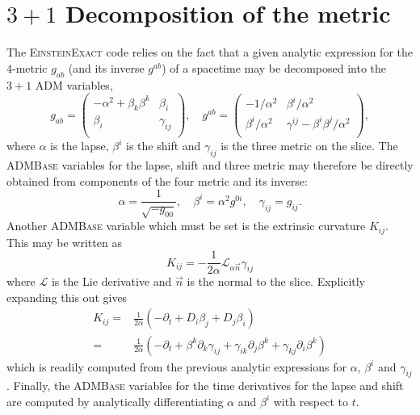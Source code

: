 \documentclass{article}
\begin{document}
\section{$3+1$ Decomposition of the metric}
The \textsc{EinsteinExact} code relies on the fact that a given analytic
expression for the $4$-metric $g_{ab}$ (and its inverse $g^{ab}$) of a spacetime
may be decomposed into the $3+1$ ADM variables,
\begin{equation}
g_{ab} =
\left(
\begin{array}{cc}
 -\alpha^2 + \beta_k \beta^k & \beta_i \\
 \beta_i & \gamma_{ij}\\
\end{array}
\right),\quad
g^{ab} =
\left(
\begin{array}{cc}
 -1/\alpha^2 & \beta^i / \alpha^2 \\
 \beta^i / \alpha^2 & \gamma^{ij} - \beta^i \beta^j / \alpha^2\\
\end{array}
\right),
\end{equation}
where $\alpha$ is the lapse, $\beta^i$ is the shift and $\gamma_{ij}$
is the three metric on the slice. The \textsc{ADMBase} variables for the
lapse, shift and three metric may therefore be directly obtained from
components of the four metric and its inverse:
\begin{equation}
\alpha = \frac{1}{\sqrt{-g_{00}}},\quad
\beta^i = \alpha^2 g^{0i},\quad
\gamma_{ij} = g_{ij}.
\end{equation}
Another \textsc{ADMBase} variable which must be set is the extrinsic
curvature $K_{ij}$. This may be written as
\begin{equation}
K_{ij} = -\frac{1}{2\alpha} \mathcal{L}_{\alpha \vec{n}} \gamma_{ij}
\end{equation}
where $\mathcal{L}$ is the Lie derivative and $\vec{n}$ is the normal to the
slice. Explicitly expanding this out gives
\begin{align}
K_{ij} = & \frac{1}{2\alpha} (-\partial_t + D_i \beta_j + D_j \beta_i) \nonumber \\
 = &  \frac{1}{2\alpha} (-\partial_t
        + \beta^k \partial_k \gamma_{ij}
        + \gamma_{ik} \partial_j \beta^k
        + \gamma_{kj} \partial_i \beta^k
      )
\end{align}
which is readily computed from the previous analytic expressions for $\alpha$,
$\beta^i$ and $\gamma_{ij}$. Finally, the \textsc{ADMBase} variables for the time
derivatives for the lapse and shift are computed by analytically differentiating
$\alpha$ and $\beta^i$ with respect to $t$.
\end{document}
